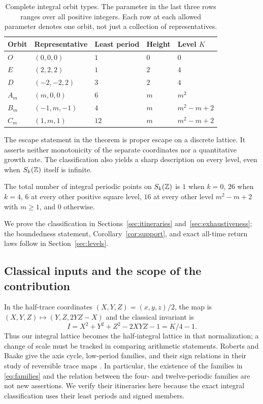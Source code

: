 \begin{table}[htbp]
\centering
\begin{tabular}{@{}lllll@{}}
\toprule
Orbit & Representative & Least period & Height & Level $K$\\
\midrule
$O$ & $(0,0,0)$ & $1$ & $0$ & $0$\\
$E$ & $(2,2,2)$ & $1$ & $2$ & $4$\\
$D$ & $(-2,-2,2)$ & $3$ & $2$ & $4$\\
$A_m$ & $(m,0,0)$ & $6$ & $m$ & $m^2$\\
$B_m$ & $(-1,m,-1)$ & $4$ & $m$ & $m^2-m+2$\\
$C_m$ & $(1,m,1)$ & $12$ & $m$ & $m^2-m+2$\\
\bottomrule
\end{tabular}
\caption{Complete integral orbit types. The parameter in the last three
rows ranges over all positive integers. Each row at each allowed
parameter denotes one orbit, not just a collection of representatives.}
\label{tab:families}
\end{table}

The escape statement in the theorem is proper escape on a discrete
lattice. It asserts neither monotonicity of the separate coordinates nor
a quantitative growth rate. The classification also yields a sharp
description on every level, even when $S_k(\mathbb Z)$ itself is infinite.

\begin{corollary}\label{cor:support}
The total number of integral periodic points on $S_k(\mathbb Z)$ is $1$ when
$k=0$, $26$ when $k=4$, $6$ at every other positive square level,
$16$ at every other level $m^2-m+2$ with $m\geq1$, and $0$ otherwise.
\end{corollary}

We prove the classification in Sections~\ref{sec:itineraries}
and~\ref{sec:exhaustiveness}; the boundedness statement,
Corollary~\ref{cor:support}, and exact all-time return laws follow in
Section~\ref{sec:levels}.

\subsection{Classical inputs and the scope of the contribution}

In the half-trace coordinates $(X,Y,Z)=(x,y,z)/2$, the map is
$(X,Y,Z)\mapsto(Y,Z,2YZ-X)$ and the classical invariant is
\begin{equation}\label{eq:normalization}
 I=X^2+Y^2+Z^2-2XYZ-1=K/4-1.
\end{equation}
Thus our integral lattice becomes the half-integral lattice in that
normalization; a change of scale must be tracked in comparing arithmetic
statements. Roberts and Baake give the axis cycle, low-period families,
and their sign relations in their study of reversible trace maps
\citep[Eq.~(29), Table~I, and pp.~849--852]{roberts1994trace}.
In particular, the existence of the families in \eqref{eq:families}
and the relation between the four- and twelve-periodic families are not
new assertions. We verify their itineraries here because the exact
integral classification uses their least periods and signed members.

